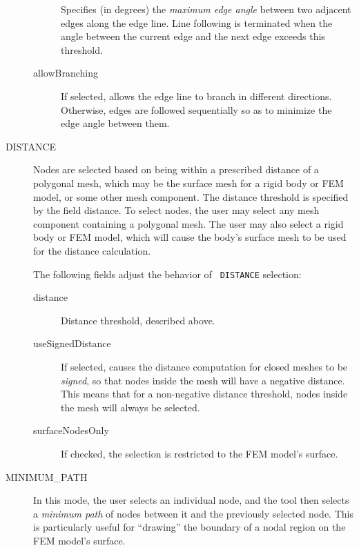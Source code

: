 \documentclass{article}
\begin{document}
\begin{description}
\begin{description}
Specifies (in degrees) the {\it maximum edge angle} between two
adjacent edges along the edge line. Line following is terminated when
the angle between the current edge and the next edge exceeds this
threshold.

\item[{\sf allowBranching}]\mbox{}

If selected, allows the edge line to branch in different directions.
Otherwise, edges are followed sequentially so as to minimize the edge
angle between them.

\end{description}

\item[DISTANCE]\mbox{}

Nodes are selected based on being within a prescribed distance of a
polygonal mesh, which may be the surface mesh for a rigid body or FEM
model, or some other mesh component. The distance threshold is
specified by the field {\sf distance}. To select nodes, the user may
select any mesh component containing a polygonal mesh.  The user may
also select a rigid body or FEM model, which will cause the body's
surface mesh to be used for the distance calculation.

The following fields adjust the behavior of {\tt
DISTANCE} selection:

\begin{description}

\item[{\sf distance}]\mbox{}

Distance threshold, described above.

\item[{\sf useSignedDistance}]\mbox{}

If selected, causes the distance computation for closed meshes to be
{\it signed}, so that nodes inside the mesh will have a negative
distance.  This means that for a non-negative distance threshold,
nodes inside the mesh will always be selected.

\item[{\sf surfaceNodesOnly}]\mbox{}

If checked, the selection is restricted to the FEM model's surface.

\end{description}

\item[MINIMUM\_PATH]\mbox{}

In this mode, the user selects an individual node, and the tool then
selects a {\it minimum path} of nodes between it and the previously
selected node. This is particularly useful for ``drawing'' the
boundary of a nodal region on the FEM model's surface.


\end{description}
\end{document}
